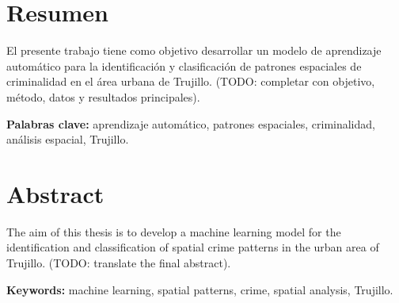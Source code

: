 

\chapter*{Resumen}


El presente trabajo tiene como objetivo desarrollar un modelo de aprendizaje
automático para la identificación y clasificación de patrones espaciales
de criminalidad en el área urbana de Trujillo. (TODO: completar con
objetivo, método, datos y resultados principales).

\vspace{1cm}

\noindent\textbf{Palabras clave:} aprendizaje automático, patrones
espaciales, criminalidad, análisis espacial, Trujillo.

\chapter*{Abstract}


The aim of this thesis is to develop a machine learning model for
the identification and classification of spatial crime patterns in
the urban area of Trujillo. (TODO: translate the final abstract).

\vspace{1cm}

\noindent\textbf{Keywords:} machine learning, spatial patterns, crime,
spatial analysis, Trujillo.
